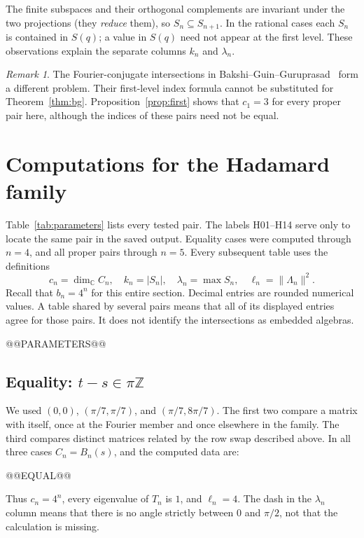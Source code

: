 \documentclass[11pt]{article}
\theoremstyle{definition}
\theoremstyle{remark}
\newtheorem{remark}[theorem]{Remark}
\newcommand{\C}{\mathbb C}
\newcommand{\Z}{\mathbb Z}
\begin{document}
The finite subspaces and their orthogonal complements are invariant
under the two projections (they \emph{reduce} them), so
\(S_n\subseteq S_{n+1}\). In the rational cases each \(S_n\) is
contained in \(S(q)\); a value in \(S(q)\) need not appear at the
first level. These observations explain the separate columns
\(k_n\) and \(\lambda_n\).

\begin{remark}
The Fourier-conjugate intersections in Bakshi--Guin--Guruprasad~\cite{BGG}
form a different problem. Their first-level index formula cannot be
substituted for Theorem~\ref{thm:bg}. Proposition~\ref{prop:first}
shows that \(c_1=3\) for every proper pair here, although the indices
of these pairs need not be equal.
\end{remark}

\section{Computations for the Hadamard family}\label{sec:results}
Table~\ref{tab:parameters} lists every tested pair. The labels H01--H14
serve only to locate the same pair in the saved output.
Equality cases were computed through \(n=4\), and all proper pairs
through \(n=5\). Every subsequent table uses the definitions
\[
 c_n=\dim_{\C}C_n,\quad k_n=|S_n|,\quad
 \lambda_n=\max S_n,\quad \ell_n=\|\Lambda_n\|^2.
\]
Recall that \(b_n=4^n\) for this entire section.
Decimal entries are rounded numerical values. A table shared by several
pairs means that all of its displayed entries agree for those pairs.
It does not identify the intersections as embedded algebras.

@@PARAMETERS@@

\subsection[Equality]{Equality: \(t-s\in\pi\Z\)}
We used \((0,0)\), \((\pi/7,\pi/7)\), and
\((\pi/7,8\pi/7)\). The first two compare a matrix with itself,
once at the Fourier member and once elsewhere in the family.
The third compares distinct matrices related by the row swap described
above. In all three cases \(C_n=B_n(s)\), and the computed data are:

@@EQUAL@@

Thus \(c_n=4^n\), every eigenvalue of \(T_n\) is \(1\),
and \(\ell_n=4\). The dash in the \(\lambda_n\) column means that
there is no angle strictly between \(0\) and \(\pi/2\), not that
the calculation is missing.
\end{document}
